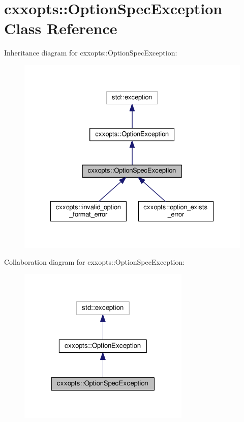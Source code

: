 \hypertarget{classcxxopts_1_1OptionSpecException}{}\section{cxxopts\+:\+:Option\+Spec\+Exception Class Reference}
\label{classcxxopts_1_1OptionSpecException}


Inheritance diagram for cxxopts\+:\+:Option\+Spec\+Exception\+:
\nopagebreak
\begin{figure}[H]
\begin{center}
\leavevmode
\includegraphics[width=330pt]{classcxxopts_1_1OptionSpecException__inherit__graph}
\end{center}
\end{figure}


Collaboration diagram for cxxopts\+:\+:Option\+Spec\+Exception\+:
\nopagebreak
\begin{figure}[H]
\begin{center}
\leavevmode
\includegraphics[width=232pt]{classcxxopts_1_1OptionSpecException__coll__graph}
\end{center}
\end{figure}
